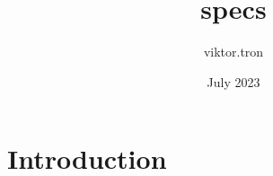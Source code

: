 \documentclass{article}
\title{specs}
\author{viktor.tron }
\date{July 2023}
\begin{document}
\maketitle

\section{Introduction}
\end{document}

